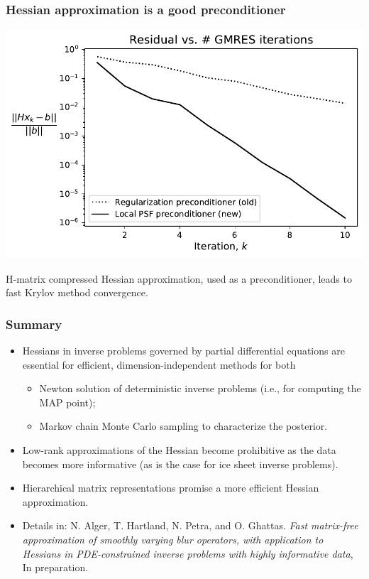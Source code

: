 \documentclass[10pt,final,xcolor=dvipsnames]{beamer}
\begin{document}
\begin{frame}
	\frametitle{Hessian approximation is a good preconditioner}
	\begin{center}
		\includegraphics[width=0.75\columnwidth]{extraplots/ice_gmres_convergence.pdf}
	\end{center}
\begin{center}
	H-matrix compressed Hessian approximation, used as a preconditioner, leads to fast Krylov method convergence.
\end{center}
\end{frame}
\begin{frame}
  \frametitle{Summary}

  \begin{itemize}
  \item Hessians in inverse problems governed by
    partial differential equations are essential for
    efficient, dimension-independent methods for both
    \begin{itemize}
    \item Newton solution of deterministic inverse problems (i.e., for
      computing the MAP point);
      \vspace{0.05in}
    \item Markov chain Monte Carlo sampling to characterize the
      posterior.
    \end{itemize}
    \vspace{0.05in}
  \item Low-rank approximations of the Hessian become
    prohibitive as the data becomes more informative (as is the case
    for ice sheet inverse problems).
    \vspace{0.05in}
  \item Hierarchical matrix representations promise a more efficient
    Hessian approximation.
  \end{itemize}
    \vspace{0.2in}
  \begin{itemize}
  \item [] \scriptsize{Details in: N. Alger, T. Hartland, N. Petra,
    and O. Ghattas. {\em Fast matrix-free approximation of smoothly
      varying blur operators, with application to Hessians in
      PDE-constrained inverse problems with highly informative data},
    In preparation.}
  \end{itemize}
\end{frame}
\end{document}
